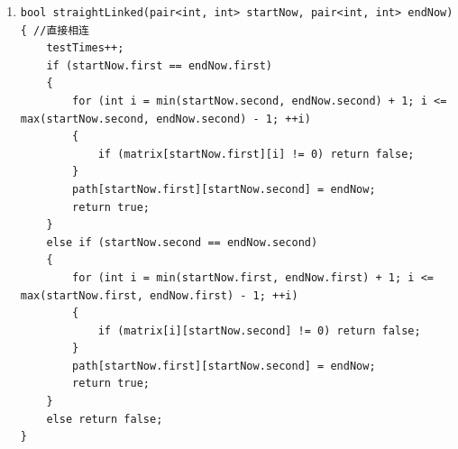\documentclass[12pt,a4paper]{article}
\theoremstyle{definition}
\begin{document}
\begin{enumerate}
{\begin{enumerate}
{\begin{lstlisting}
			i = 1;
			while ((*it).first - i > 0 && !visited[(*it).first - i][(*it).second] && matrix[(*it).first - i][(*it).second] == 0)
			{
				tempStorePoints.insert(pair<int, int>((*it).first - i, (*it).second));
				path[(*it).first - i][(*it).second] = *it;
				visited[(*it).first - i][(*it).second] = true;
				++i;
				++testTimes;
			}
			if ((*it).first - i > 0 && matrix[(*it).first - i][(*it).second] != 0)
			{
				linkedPoints.insert(pair<int, int>((*it).first - i, (*it).second));
				path[(*it).first - i][(*it).second] = *it;
				visited[(*it).first - i][(*it).second] = true;
			}
								
			i = 1;
			while ((*it).second - i > 0 && !visited[(*it).first][(*it).second - i] && matrix[(*it).first][(*it).second - i] == 0)
			{
				tempStorePoints.insert(pair<int, int>((*it).first, (*it).second - i));
				path[(*it).first][(*it).second - i] = *it;
				visited[(*it).first][(*it).second - i] = true;
				++i;
				++testTimes;
			}
			if ((*it).second - i > 0 && matrix[(*it).first][(*it).second - i] != 0)
			{
				linkedPoints.insert(pair<int, int>((*it).first, (*it).second - i));
				path[(*it).first][(*it).second - i] = *it;
				visited[(*it).first][(*it).second - i] = true;
			}
		}
		templinkedPoints.clear();
		for (set<pair<int, int>>::iterator it = tempStorePoints.begin(); it != tempStorePoints.end(); ++it)
		{
			templinkedPoints.insert(*it);
		}
		tempStorePoints.clear();
		for (set<pair<int, int>>::iterator it = templinkedPoints.begin(); it != templinkedPoints.end(); ++it)
		{
			linkedPoints.insert(*it);
		}
		if (linkedPoints.find(endPoint) != linkedPoints.end())
		{
			path[startPoint.first][startPoint.second] = pair<int, int>(0, 0);
			testTimes = linkedPoints.size();
			return true;
		}
	}
	testTimes = linkedPoints.size();
	path[startPoint.first][startPoint.second] = pair<int, int>(0, 0);
	return linkedPoints.find(endPoint) != linkedPoints.end();
}
				\end{lstlisting}
			} 
			\item{
\begin{lstlisting}
bool straightLinked(pair<int, int> startNow, pair<int, int> endNow)
{ //直接相连
	testTimes++;
	if (startNow.first == endNow.first)
	{
		for (int i = min(startNow.second, endNow.second) + 1; i <= max(startNow.second, endNow.second) - 1; ++i)
		{
			if (matrix[startNow.first][i] != 0)	return false;
		}
		path[startNow.first][startNow.second] = endNow;
		return true;
	}
	else if (startNow.second == endNow.second)
	{
		for (int i = min(startNow.first, endNow.first) + 1; i <= max(startNow.first, endNow.first) - 1; ++i)
		{
			if (matrix[i][startNow.second] != 0) return false;
		}
		path[startNow.first][startNow.second] = endNow;
		return true;
	}
	else return false;
}


\end{lstlisting}}
\end{enumerate}}
\end{enumerate}
\end{document}
